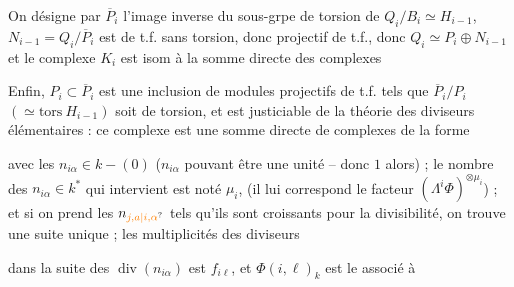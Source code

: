 
On désigne par $\overline P_i$ l'image inverse  du sous-grpe de torsion de $Q_i/B_i\simeq H_{i-1}$, $N_{i-1}=Q_i/\overline P_i$ est de t.f. sans torsion, donc  projectif de t.f., donc $Q_i\simeq P_i\oplus N_{i-1}$ et le complexe $K_i$ est isom à la somme directe des complexes


Enfin, $P_i\subset\overline P_i$ est une inclusion de modules projectifs de t.f. tels que $\overline P_i/P_i$ $(\simeq\mathrm{tors}\ H_{i-1})$ soit de torsion, et est justiciable de la théorie des diviseurs élémentaires :   ce  complexe est une somme directe de complexes de la forme


avec les $n_{i\alpha}\in k-(0)$ ($n_{i\alpha}$ pouvant être une unité -- donc $1$ alors) ; le nombre des $n_{i\alpha}\in k^{*}$ qui intervient est noté $\mu_i$, (il lui correspond le facteur $(\Lambda^{i}\Phi)^{\otimes\mu_i}$) ; et si on prend les  $n_{\unsure{j,a|i,\alpha}}$ tels qu'ils sont croissants pour la divisibilité, on trouve une suite unique ; les multiplicités  des diviseurs 


dans la suite des $\operatorname{div}(n_{i\alpha})$ est $f_{i\ell}$, et $\Phi(i,\ell)_k$ est le   associé à

